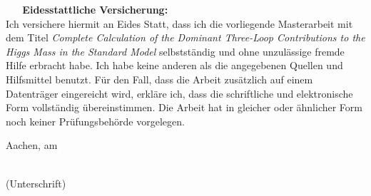 \documentclass[a4paper,12pt]{book}
\begin{document}
\newpage{}
\thispagestyle{empty}
\textcolor{white}{bla}
\clearpage
\newpage{}
\thispagestyle{empty}
\noindent
\textbf{Eidesstattliche Versicherung:}\\
Ich versichere hiermit an Eides Statt, dass ich die vorliegende Masterarbeit mit dem Titel \textit{Complete Calculation of the Dominant Three-Loop Contributions to the Higgs Mass in the Standard Model} selbstständig und ohne unzulässige fremde Hilfe erbracht habe. Ich habe keine anderen als die angegebenen Quellen und Hilfsmittel benutzt. Für den Fall, dass die Arbeit zusätzlich auf einem Datenträger eingereicht wird, erkläre ich, dass die schriftliche und elektronische Form vollständig übereinstimmen. Die Arbeit hat in gleicher oder ähnlicher Form noch keiner Prüfungsbehörde vorgelegen. 
\vspace*{5cm}

\noindent
\begin{minipage}[h]{0.4\linewidth}
Aachen, am \dotfill\\
\vspace*{2.5mm}
\end{minipage}
\hspace*{0.1\linewidth}
\begin{minipage}[h]{0.5\linewidth}
  \begin{center}
    \dotfill\\
    (Unterschrift)
  \end{center}
\end{minipage}
\end{document}
